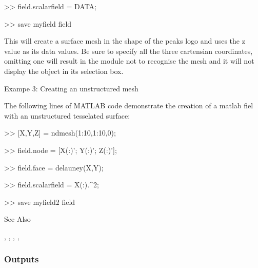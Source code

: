  \textgreater{}\textgreater{} field.scalarfield = DATA; 



 \textgreater{}\textgreater{} save myfield field 



 This will create a surface mesh in the shape of the peaks logo and uses the z value as its data values. Be sure to specify
	all the three cartensian coordinates, omitting one will result in the module not to recognise the mesh and it will not display
	the object in its selection box.

 Exampe 3: Creating an unstructured mesh 

 The following lines of MATLAB code demonstrate the creation of a matlab fiel with an unstructured tesselated surface: 



 \textgreater{}\textgreater{} [X,Y,Z] = ndmesh(1:10,1:10,0); 



 \textgreater{}\textgreater{} field.node = [X(:)'; Y(:)'; Z(:)']; 



 \textgreater{}\textgreater{} field.face = delauney(X,Y); 



 \textgreater{}\textgreater{} field.scalarfield = X(:).\textasciicircum{}2; 



 \textgreater{}\textgreater{} save myfield2 field 

See Also 

,
	,
	,
	,
	

\subsubsection*{Outputs}

